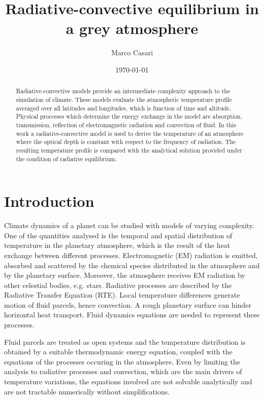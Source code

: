 \documentclass[a4paper,10pt,twocolumn,\classoptions]{article}
\begin{document}
\title{Radiative-convective equilibrium in a grey atmosphere}
\author{Marco Casari}
\date{\today}
\maketitle

\begin{abstract}
  Radiative-convective models provide an intermediate complexity approach to the simulation of climate. These models evaluate the atmospheric temperature profile averaged over all latitudes and longitudes, which is function of time and altitude.
  Physical processes which determine the energy exchange in the model are absorption, transmission, reflection of electromagnetic radiation and convection of fluid.
  In this work a radiative-convective model is used to derive the temperature of an atmosphere where the optical depth is constant with respect to the frequency of radiation. The resulting temperature profile is compared with the analytical solution provided under the condition of radiative equilibrium.
\end{abstract}


\section{Introduction}
\label{sec:Introduction}
Climate dynamics of a planet can be studied with models of varying complexity. One of the quantities analysed is the temporal and spatial distribution of temperature in the planetary atmosphere, which is the result of the heat exchange between different processes. Electromagnetic (EM) radiation is emitted, absorbed and scattered by the chemical species distributed in the atmosphere and by the planetary surface. Moreover, the atmosphere receives EM radiation by other celestial bodies, e.g. stars. Radiative processes are described by the Radiative Transfer Equation (RTE).
Local temperature differences generate motion of fluid parcels, hence convection. A rough planetary surface can hinder horizontal heat transport. Fluid dynamics equations are needed to represent these processes.

Fluid parcels are treated as open systems and the temperature distribution is obtained by a suitable thermodynamic energy equation, coupled with the equations of the processes occuring in the atmosphere. Even by limiting the analysis to radiative processes and convection, which are the main drivers of temperature variations, the equations involved are not solvable analytically and are not tractable numerically without simplifications.
\end{document}
